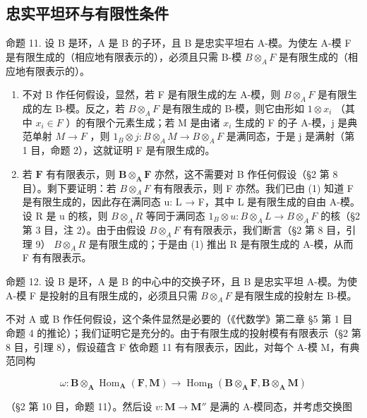 \subsection{忠实平坦环与有限性条件}

命题 11. 设 B 是环，A 是 B 的子环，且 B 是忠实平坦右 A-模。为使左 A-模 F 是有限生成的（相应地有限表示的），必须且只需 B-模 \(B \otimes_{A} F\) 是有限生成的（相应地有限表示的）。

\begin{enumerate}
\def\labelenumi{(\arabic{enumi})}
\item
  不对 B 作任何假设，显然，若 F 是有限生成的左 A-模，则 \(B \otimes_{A} F\) 是有限生成的左 B-模。反之，若 \(B \otimes_{A} F\) 是有限生成的 B-模，则它由形如 \(1 \otimes x_{i}\) （其中 \(x_{i} \in F\) ）的有限个元素生成；若 M 是由诸 \(x_{i}\) 生成的 F 的子 A-模，j 是典范单射 \(M \to F\) ，则 \(1_{B} \otimes j: B \otimes_{A} M \to B \otimes_{A} F\) 是满同态，于是 j 是满射（第 1 目，命题 2），这就证明 F 是有限生成的。
\item
  若 \(\mathbf{F}\) 有有限表示，则 \(\mathbf{B} \otimes_{\mathbf{A}} \mathbf{F}\) 亦然，这不需要对 B 作任何假设（§2 第 8 目）。剩下要证明：若 \(B \otimes_{A} F\) 有有限表示，则 F 亦然。我们已由 (1) 知道 F 是有限生成的，因此存在满同态 u: L → F，其中 L 是有限生成的自由 A-模。设 R 是 u 的核，则 \(B \otimes_{A} R\) 等同于满同态 \(1_{B} \otimes u: B \otimes_{A} L \to B \otimes_{A} F\) 的核（§2 第 3 目，注 2）。由于由假设 \(B \otimes_{A} F\) 有有限表示，我们断言（§2 第 8 目，引理 9） \(B \otimes_{A} R\) 是有限生成的；于是由 (1) 推出 R 是有限生成的 A-模，从而 F 有有限表示。
\end{enumerate}

命题 12. 设 B 是环，A 是 B 的中心中的交换子环，且 B 是忠实平坦 A-模。为使 A-模 F 是投射的且有限生成的，必须且只需 \(B \otimes_{A} F\) 是有限生成的投射左 B-模。

不对 A 或 B 作任何假设，这个条件显然是必要的（《代数学》第二章 §5 第 1 目命题 4 的推论）；我们证明它是充分的。由于有限生成的投射模有有限表示（§2 第 8 目，引理 8），假设蕴含 F 依命题 11 有有限表示，因此，对每个 A-模 M，有典范同构

\[
\omega : \mathbf {B} \otimes_ {\mathbf {A}} \operatorname{Hom} _ {\mathbf {A}} (\mathbf {F}, \mathbf {M}) \rightarrow \operatorname{Hom} _ {\mathbf {B}} (\mathbf {B} \otimes_ {\mathbf {A}} \mathbf {F}, \mathbf {B} \otimes_ {\mathbf {A}} \mathbf {M})
\]

（§2 第 10 目，命题 11）。然后设 \(v: \mathbf{M} \to \mathbf{M}''\) 是满的 A-模同态，并考虑交换图

